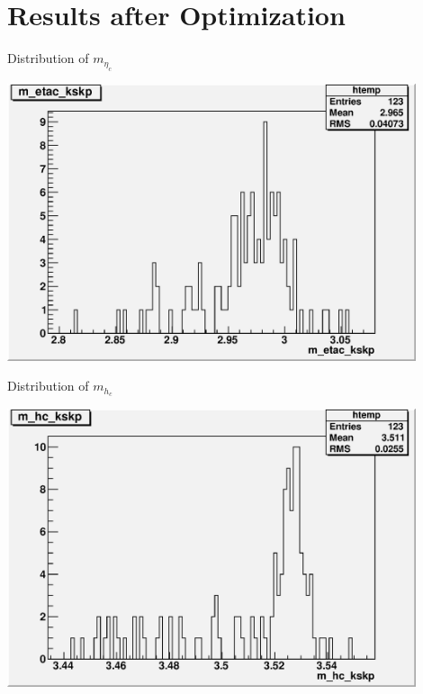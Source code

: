 \documentclass{beamer}
\begin{document}
        \section{Results after Optimization}
        \begin{frame}{Distribution of $m_{\eta_c}$}
        \begin{center}
        \includegraphics[width=0.9\textwidth,angle=0]{figures/Pi0hc_optimization_m_etac_kskp.eps}
        \end{center}
        \end{frame}
        \begin{frame}{Distribution of $m_{h_c}$}
        \begin{center}
        \includegraphics[width=0.9\textwidth,angle=0]{figures/Pi0hc_optimization_m_hc_kskp.eps}
        \end{center}
        \end{frame}
\end{document}
